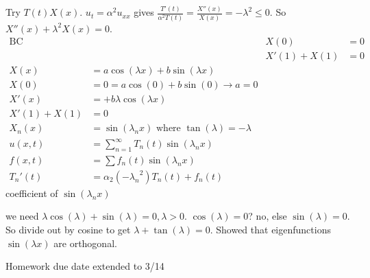\documentclass{article}
\begin{document}
Try $T(t)X(x)$. $u_t=\alpha^2u_{xx}$ gives $\frac{T'(t)}{\alpha^2T(t)}=\frac{X''(x)}{X(x)}=-\lambda^2\le0$. So $X''(x)+\lambda^2X(x)=0$.
\begin{align*}
  \text{BC}&&X(0)&=0\\
  &&X'(1)+X(1)&=0\\
  X(x)&=a\cos(\lambda x)+b\sin(\lambda x)\\
  X(0)&=0=a\cos(0)+b\sin(0)\to a=0\\
  X'(x)&=+b\lambda\cos(\lambda x)\\
  X'(1)+X(1)&=0\\
  X_n(x)&=\sin(\lambda_n x) \text{ where } \tan(\lambda)=-\lambda\\
  u(x,t)&=\sum\limits_{n=1}^\infty{T_n(t)\sin(\lambda_nx)}\\
  f(x,t)&=\sum\limits{f_n(t)\sin(\lambda_nx)}\\
  {T_n}'(t)&=\alpha_2(-{\lambda_n}^2)T_n(t)+f_n(t)
\end{align*}
coefficient of $\sin(\lambda_nx)$

we need $\lambda\cos(\lambda)+\sin(\lambda)=0, \lambda>0$. $\cos(\lambda)=0$? no, else $\sin(\lambda)=0$. So divide out by cosine to get $\lambda+\tan(\lambda)=0$. Showed that eigenfunctions $\sin(\lambda x)$ are orthogonal.

Homework due date extended to 3/14
\end{document}
